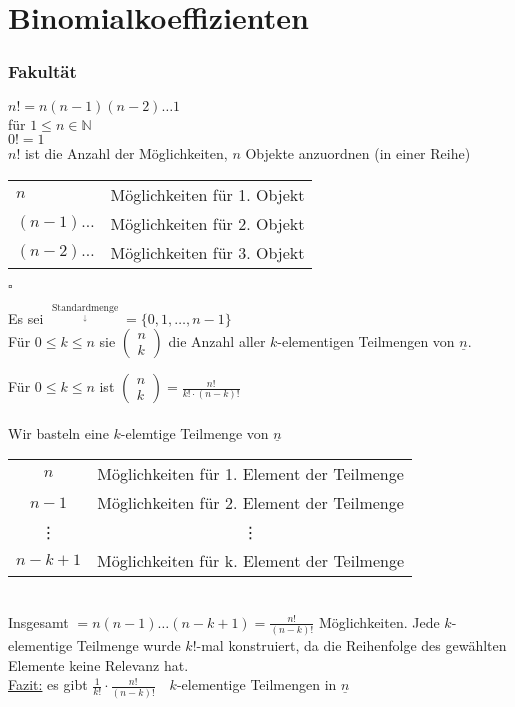 \section{Binomialkoeffizienten}

%
%
%

\subsubsection{Fakultät}
$n! = n(n-1)(n-2)\dots1$\\
für $1\leq n\in\mathbb{N}$\\
$0!=1$\\

%
%
%

\stz
$n!$ ist die Anzahl der Möglichkeiten, $n$ Objekte anzuordnen (in einer Reihe)\\

%
%
%

\bws 

 \begin{tabular}{ll}
$n$  & Möglichkeiten für 1. Objekt \\
$(n-1)\dots$ & Möglichkeiten für 2. Objekt \\
$(n-2)\dots$ & Möglichkeiten für 3. Objekt\\
 \end{tabular}$\square$

%
%
%

Es sei $\mathop{\underline{n}}\limits^{\mathop{\textrm{Standardmenge}}\limits_{\downarrow}} = \{0,1,\dots,n-1\}$\\ 
Für $0\leq k \leq n$ sie $\begin{pmatrix} n \\ k \end{pmatrix}$ die Anzahl  aller $k$-elementigen Teilmengen von $\underline{n}$. 

%
%
%

\stz
Für $0\leq k \leq n$ ist $\begin{pmatrix} n \\ k \end{pmatrix} = \frac{n!}{k! \cdot (n-k)!} $ \\
\bws \\
Wir basteln eine $k$-elemtige Teilmenge von $\underline{n}$ \\
\begin{tabular}{cc}
$n$ & Möglichkeiten für 1. Element der Teilmenge \\
$n-1$ & Möglichkeiten für 2. Element der Teilmenge  \\
 \vdots &  \vdots  \\
$n-k+1$ & Möglichkeiten für k. Element der Teilmenge \\
\end{tabular}
\\
Insgesamt $= n(n-1) \dotsc (n-k+1)=\frac{n!}{(n-k)!}$ Möglichkeiten. Jede $k$-elementige Teilmenge wurde $k!$-mal konstruiert, da die Reihenfolge des gewählten Elemente keine Relevanz hat.\\
\underline{Fazit:} es gibt $\frac{1}{k!} \cdot \frac{n!}{(n-k)!} \quad k$-elementige Teilmengen in $\underline{n}$

